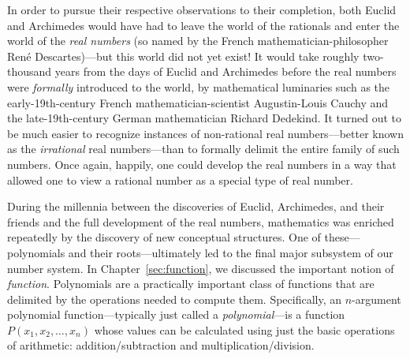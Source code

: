 In order to pursue their respective observations to their completion, both Euclid and Archimedes would have had to leave the world of the rationals and enter the world of the {\it real numbers} (so named by the French mathematician-philosopher Ren\'{e} Descartes)---but this world did not yet exist!  It would take roughly two-thousand years from the days of Euclid and Archimedes before the real numbers were {\em formally} introduced to the world, by mathematical luminaries such as the early-19th-century French mathematician-scientist Augustin-Louis Cauchy and the late-19th-century German mathematician Richard Dedekind.  It turned out to be much easier to recognize instances of non-rational real numbers---better known as the {\it irrational} real numbers---than to formally delimit the entire family of such numbers.  Once again, happily, one could develop the real numbers in a way that allowed one to view a rational number as a special type of real number.  

\medskip

 

During the millennia between the discoveries of Euclid, Archimedes, and their friends and the full development of the real numbers, mathematics was enriched repeatedly by the discovery of new conceptual structures.  One of these---polynomials and their roots---ultimately led to the final major subsystem of our number system.  In Chapter~\ref{sec:function}, we discussed the important notion of {\em function}.  Polynomials are a practically important class of functions that are delimited by the operations needed to compute them.  Specifically, an $n$-argument polynomial function---typically just called a {\it polynomial}---is a function $P(x_1, x_2, \ldots, x_n)$ whose values can be calculated using just the basic operations of arithmetic: addition/subtraction and multiplication/division.

\bigskip


\noindent {}

